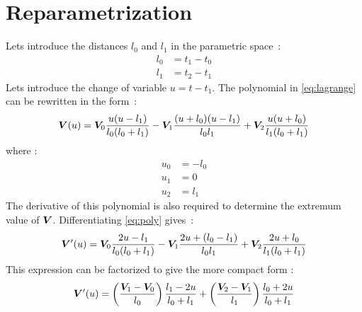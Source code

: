 \section{Reparametrization}
Lets introduce the distances $l_0$ and $l_1$ in the parametric space~:
\begin{subequations}
	\begin{alignat}{1}
	l_0 &= t_1 - t_0 \\
	l_1 &= t_2 - t_1
	\end{alignat}
\end{subequations}
Lets introduce the change of variable $u = t - t_1$. The polynomial in \cref{eq:lagrange} can be rewritten in the form~:
\begin{equation}
	\boldsymbol{V}(u) = 
	\boldsymbol{V}_0 \frac{u(u-l_1)}{l_0(l_0+l_1)}
	- \boldsymbol{V}_1 \frac{(u+l_0)(u-l_1)}{l_0 l_1}
	+ \boldsymbol{V}_2 \frac{u(u+l_0)}{l_1(l_0+l_1)}
	\label{eq:poly}
\end{equation}
where :
\begin{subequations}
	\begin{alignat}{1}
	u_0 &= -l_0 \\
	u_1 &= 0 \\
	u_2 &= l_1
	\end{alignat}
\end{subequations}
The derivative of this polynomial is also required to determine the extremum value of $\boldsymbol{V}$. Differentiating \cref{eq:poly} gives~:
\begin{equation}
	\boldsymbol{V}'(u) = 
	\boldsymbol{V}_0 \frac{2u - l_1}{l_0(l_0+l_1)}
	- \boldsymbol{V}_1 \frac{2u + (l_0 - l_1)}{l_0 l_1}
	+ \boldsymbol{V}_2 \frac{2u + l_0}{l_1(l_0+l_1)}
	\label{eq:dpoly}
\end{equation}
This expression can be factorized to give the more compact form :
\begin{equation}
	\boldsymbol{V}'(u) = 
	\left(\frac{\boldsymbol{V}_1 - \boldsymbol{V}_0}{l_0}\right) \frac{l_1 - 2u}{l_0+l_1}
	+
	\left(\frac{\boldsymbol{V}_2 - \boldsymbol{V}_1}{l_1}\right)  \frac{l_0 + 2u}{l_0+l_1}
	\label{eq:dpoly2}
\end{equation}
